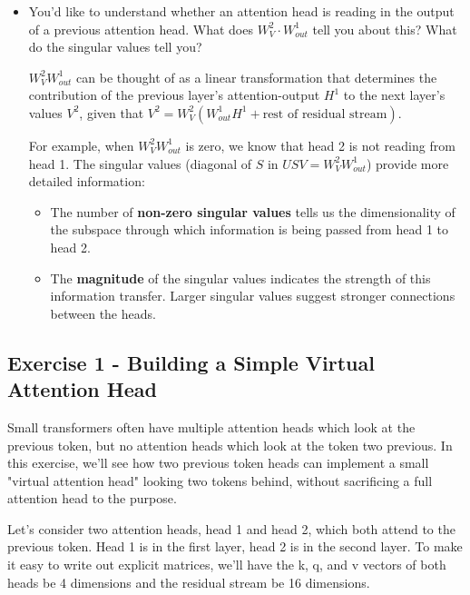 \documentclass[11pt]{article}
\newenvironment{answerbox}%
  {\begin{mdframed}[linecolor=darkgray,%
                    roundcorner=10pt,innertopmargin=10pt,%
                    innerbottommargin=10pt,skipabove=12pt,skipbelow=12pt]}%
  {\end{mdframed}}
\begin{document}
\begin{itemize}
    \item You'd like to understand whether an attention head is reading in the output of a previous attention head. What does $W_V^2 \cdot W_{out}^1$ tell you about this? What do the singular values tell you?

    \begin{answerbox}
        $W_V^2 W_{out}^1$ can be thought of as a linear transformation that determines the contribution of the previous layer's attention-output $H^1$ to the next layer's values $V^2$, given that $V^2 = W_V^2 (W_{out}^1 H^1 + \text{rest of residual stream})$.

        For example, when $W_V^2 W_{out}^1$ is zero, we know that head 2 is not reading from head 1. The singular values (diagonal of $S$ in $USV = W_V^2 W_{out}^1$) provide more detailed information:

        \begin{itemize}
            \item The number of \textbf{non-zero singular values} tells us the dimensionality of the subspace through which information is being passed from head 1 to head 2.
        \item The \textbf{magnitude} of the singular values indicates the strength of this information transfer. Larger singular values suggest stronger connections between the heads.
        \end{itemize}
        
    \end{answerbox}
\end{itemize}



\subsection*{Exercise 1 - Building a Simple Virtual Attention Head}

Small transformers often have multiple attention heads which look at the previous token, but no attention heads which look at the token two previous. In this exercise, we'll see how two previous token heads can implement a small "virtual attention head" looking two tokens behind, without sacrificing a full attention head to the purpose.

Let's consider two attention heads, head 1 and head 2, which both attend to the previous token. Head 1 is in the first layer, head 2 is in the second layer. To make it easy to write out explicit matrices, we'll have the k, q, and v vectors of both heads be 4 dimensions and the residual stream be 16 dimensions.
\end{document}
